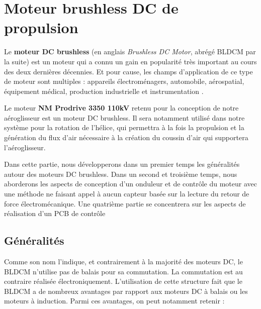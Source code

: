 \documentclass[a4paper,12pt]{report}
\begin{document}
	\newpage
	
		\section{Moteur brushless DC de propulsion}
		
		\vspace{-1em}
		
		Le \textbf{moteur DC brushless} (en anglais \textit{Brushless DC Motor}, abrégé BLDCM par la suite) est un moteur qui a connu un gain en popularité très important au cours des deux dernières décennies. Et pour cause, les champs d'application de ce type de moteur sont multiples : appareils électroménagers, automobile, aérospatial, équipement médical, production industrielle et instrumentation \cite{AN885}. 
			
		Le moteur \textbf{NM Prodrive 3350 110kV} retenu pour la conception de notre aéroglisseur est un moteur DC brushless. Il sera notamment utilisé dans notre système pour la rotation de l'hélice, qui permettra à la fois la propulsion et la génération du flux d'air nécessaire à la création du coussin d'air qui supportera l'aéroglisseur.
			
			Dans cette partie, nous développerons dans un premier temps les généralités autour des moteurs DC brushless. Dans un second et troisième temps, nous aborderons les aspects de conception d'un onduleur et de contrôle du moteur avec une méthode ne faisant appel à aucun capteur basée sur la lecture du retour de force électromécanique. Une quatrième partie se concentrera sur les aspects de réalisation d'un PCB de contrôle 
			
			\vspace{-1em}
		
			\subsection{Généralités}
			
			\vspace{-1em}
			
			Comme son nom l'indique, et contrairement à la majorité des moteurs DC, le BLDCM n'utilise pas de balais pour sa commutation. La commutation est au contraire réalisée électroniquement. L'utilisation de cette structure fait que le BLDCM a de nombreux avantages par rapport aux moteurs DC à balais ou les moteurs à induction. Parmi ces avantages, on peut notamment retenir :
			
			\vspace{-1em}
			
\end{document}
